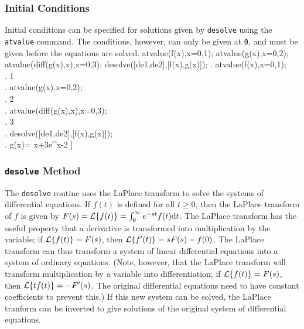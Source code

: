 \subsubsection{Initial Conditions}

Initial conditions can be specified for solutions given by
\texttt{desolve} using the \texttt{atvalue} command.
The conditions, however, can only be given at \texttt{0}, and
must be given before the equations are solved.
\beginmaximasession
atvalue(f(x),x=0,1);
atvalue(g(x),x=0,2);
atvalue(diff(g(x),x),x=0,3);
desolve([de1,de2],[f(x),g(x)]);
\maximatexsession
{}.  atvalue(f(x),x=0,1); \\
.   1 \\
.  atvalue(g(x),x=0,2); \\
.   2 \\
.  atvalue(diff(g(x),x),x=0,3); \\
.   3 \\
.  desolve([de1,de2],[f(x),g(x)]); \\
.   \left[ f\left(x\right)=3\*e^{x}-2,\linebreak[0]g\left(x\right)=
 \cos x+3\*e^{x}-2 \right]  \\
\endmaximasession

\subsubsection{\texttt{desolve} Method}

The \texttt{desolve} routine uses the LaPlace transform to solve the
systems of differential equations.
If $f(t)$ is defined for all $t \ge 0$, then the LaPlace transform of
$f$ is given by $F(s)={\cal L}\{f(t)\} = \int_0^\infty
e^{-st}f(t)\textrm{d}t$.   The LaPlace transform has the useful
property that a derivative is transformed into multiplication by the
variable; if ${\cal L}\{f(t)\} = F(s)$, then 
${\cal L}\{f'(t)\} = sF(s)-f(0)$.  The LaPlace transform can thus
transform a system of linear differential equations into a system of
ordinary equations.  
(Note, however, that the LaPlace transform will transform
multiplication by a variable into differentiation; 
if ${\cal L}\{f(t)\} = F(s)$, then ${\cal L}\{tf(t)\} = -F'(s)$. 
The original differential equations need to have constant
coefficients to prevent this.)
If this new system can be solved, the LaPlace
tranform can be inverted to give solutions of the original system of
differential equations.

